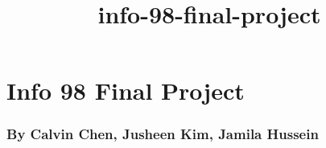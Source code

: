 \documentclass[11pt]{article}
\title{info-98-final-project}
\begin{document}
    
    
    \maketitle
    
    

    
    \section{Info 98 Final Project}\label{info-98-final-project}

\subsubsection{By Calvin Chen, Jusheen Kim, Jamila
Hussein}\label{by-calvin-chen-jusheen-kim-jamila-hussein}
\end{document}
